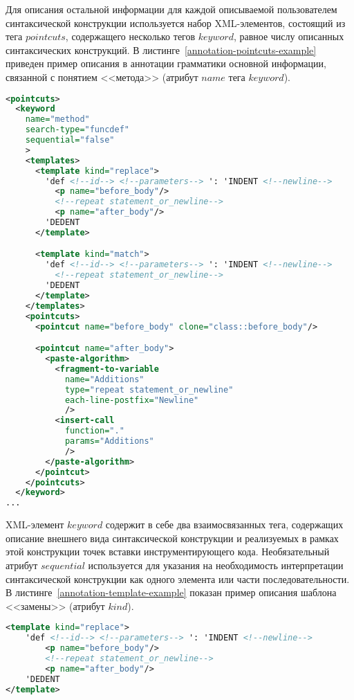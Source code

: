 Для описания остальной информации для каждой описываемой пользователем синтаксической конструкции используется набор XML-элементов, состоящий из тега $pointcuts$, содержащего несколько тегов $keyword$, равное числу описанных синтаксических конструкций.
В листинге~\ref{annotation-pointcuts-example} приведен пример описания в аннотации грамматики основной информации, связанной с понятием <<метода>> (атрибут $name$ тега $keyword$).

\begin{lstlisting}[frame=single, language=XML, label={annotation-pointcuts-example}, caption={Пример описания основной информации одной конструкции для языка Python.}]
<pointcuts>
  <keyword
    name="method"
    search-type="funcdef"
    sequential="false"
    >
    <templates>
      <template kind="replace">
        'def <!--id--> <!--parameters--> ': 'INDENT <!--newline-->
          <p name="before_body"/>
          <!--repeat statement_or_newline-->
          <p name="after_body"/>
        'DEDENT
      </template>

      <template kind="match">
        'def <!--id--> <!--parameters--> ': 'INDENT <!--newline-->
          <!--repeat statement_or_newline-->
        'DEDENT
      </template>
    </templates>
    <pointcuts>
      <pointcut name="before_body" clone="class::before_body"/>

      <pointcut name="after_body">
        <paste-algorithm>
          <fragment-to-variable
            name="Additions"
            type="repeat statement_or_newline"
            each-line-postfix="Newline"
            />
          <insert-call
            function="."
            params="Additions"
            />
        </paste-algorithm>
      </pointcut>
    </pointcuts>
  </keyword>
...
\end{lstlisting}

XML-элемент $keyword$ содержит в себе два взаимосвязанных тега, содержащих описание внешнего вида синтаксической конструкции и реализуемых в рамках этой конструкции точек вставки инструментирующего кода.
Необязательный атрибут $sequential$ используется для указания на необходимость интерпретации синтаксической конструкции как одного элемента или части последовательности.
В листинге~\ref{annotation-template-example} показан пример описания шаблона <<замены>> (атрибут $kind$).

\begin{lstlisting}[frame=single, language=XML, label={annotation-template-example}, caption={Пример описания шаблона.}]
<template kind="replace">
    'def <!--id--> <!--parameters--> ': 'INDENT <!--newline-->
        <p name="before_body"/>
        <!--repeat statement_or_newline-->
        <p name="after_body"/>
    'DEDENT
</template>
\end{lstlisting}

